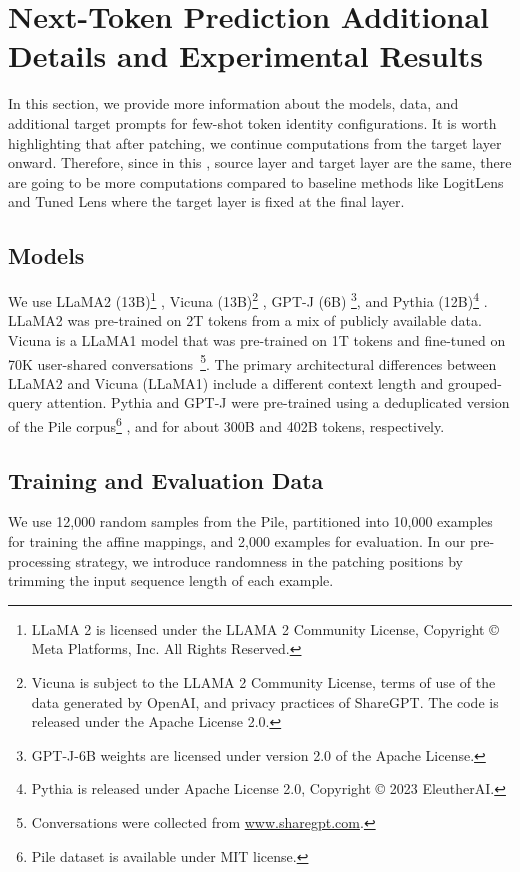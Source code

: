 \documentclass{article}
\theoremstyle{plain}
\theoremstyle{definition}
\theoremstyle{remark}
\begin{document}
\section{Next-Token Prediction Additional Details and Experimental Results}
In this section, we provide more information about the models, data, and additional target prompts for few-shot token identity \methodName{} configurations. It is worth highlighting that after patching, we continue computations from the target layer onward. Therefore, since in this \methodName{}, source layer and target layer are the same, there are going to be more computations compared to baseline methods like LogitLens \citep{logitlens, geva-etal-2022-lm} and Tuned Lens \citep{belrose2023eliciting,din2023jump} where the target layer is fixed at the final layer.

\subsection{Models}
\label{section:ntp_models}
We use LLaMA2 (13B)\footnote{LLaMA 2 is licensed under the LLAMA 2 Community License, Copyright © Meta Platforms, Inc. All Rights Reserved.} \citep{touvron2023llama}, Vicuna (13B)\footnote{Vicuna is subject to the LLAMA 2 Community License, terms of use of the data generated by OpenAI, and privacy practices of ShareGPT. The code is released under the Apache License 2.0.} \citep{vicuna2023}, GPT-J (6B) \citep{gpt-j}\footnote{GPT-J-6B weights are licensed under version 2.0 of the Apache License.}, and Pythia (12B)\footnote{Pythia is released under Apache License 2.0, Copyright © 2023 EleutherAI.} \citep{pythia}. LLaMA2 was pre-trained on 2T tokens from a mix of publicly available data. Vicuna is a LLaMA1 \citep{touvron2023llama1} model that was pre-trained on 1T tokens and fine-tuned on 70K user-shared conversations~\footnote{Conversations were collected from \url{www.sharegpt.com}.}.
The primary architectural differences between LLaMA2 and Vicuna (LLaMA1) include a different context length and grouped-query attention. Pythia and GPT-J were pre-trained using a deduplicated version of the Pile corpus\footnote{Pile dataset is available under MIT license.} \citep{gao2020pile}, and for about 300B and 402B tokens, respectively.

\subsection{Training and Evaluation Data}
\label{section:ntp_data}
We use 12,000 random samples from the Pile, partitioned into 10,000 examples for training the affine mappings, and 2,000 examples for evaluation. In our pre-processing strategy, we introduce randomness in the patching positions by trimming the input sequence length of each example. 
\end{document}
